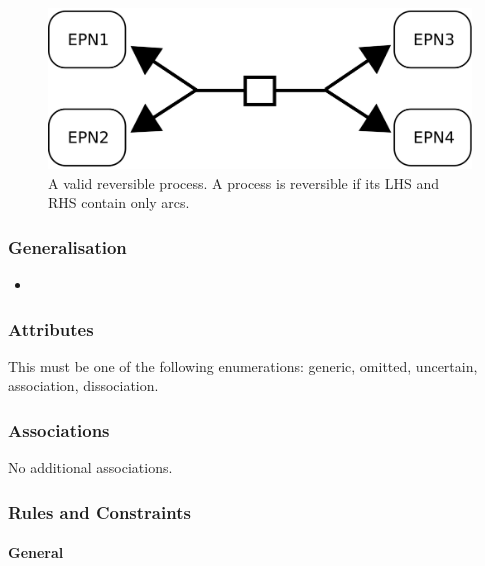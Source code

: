 \begin{figure}[H]
  \centering
  \includegraphics[scale = 0.4]{images/reversible_process}
  \caption{A valid reversible process. A process is reversible if its LHS and RHS contain only  arcs.}
  \label{fig:process-reversibility}
\end{figure}
 
\subsubsection{Generalisation}

\begin{itemize}
\item {}
\end{itemize}

\subsubsection{Attributes}

\begin{attributes}
   This must be one of the following
  enumerations: generic, omitted, uncertain, association, dissociation.
\end{attributes}

\subsubsection{Associations}

No additional associations.

\subsubsection{Rules and Constraints}

\paragraph{General}

